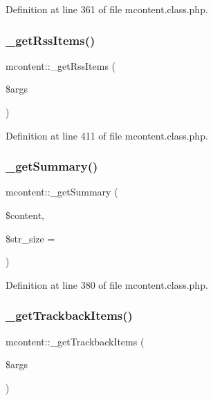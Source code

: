 Definition at line 361 of file mcontent.\+class.\+php.

\hypertarget{classmcontent_a0fe2153c16b911c8dc3fe1184a72d378}{}\label{classmcontent_a0fe2153c16b911c8dc3fe1184a72d378} 
\subsubsection{\texorpdfstring{\+\_\+get\+Rss\+Items()}{\_getRssItems()}}
{\footnotesize\ttfamily mcontent\+::\+\_\+get\+Rss\+Items (\begin{DoxyParamCaption}\item[{}]{\$args }\end{DoxyParamCaption})}



Definition at line 411 of file mcontent.\+class.\+php.

\hypertarget{classmcontent_a4b4f237f52d20441108cadc2ffe0d43c}{}\label{classmcontent_a4b4f237f52d20441108cadc2ffe0d43c} 
\subsubsection{\texorpdfstring{\+\_\+get\+Summary()}{\_getSummary()}}
{\footnotesize\ttfamily mcontent\+::\+\_\+get\+Summary (\begin{DoxyParamCaption}\item[{}]{\$content,  }\item[{}]{\$str\+\_\+size = {} }\end{DoxyParamCaption})}



Definition at line 380 of file mcontent.\+class.\+php.

\hypertarget{classmcontent_a8ef730735e4af7716442ae3c5d1b749a}{}\label{classmcontent_a8ef730735e4af7716442ae3c5d1b749a} 
\subsubsection{\texorpdfstring{\+\_\+get\+Trackback\+Items()}{\_getTrackbackItems()}}
{\footnotesize\ttfamily mcontent\+::\+\_\+get\+Trackback\+Items (\begin{DoxyParamCaption}\item[{}]{\$args }\end{DoxyParamCaption})}

